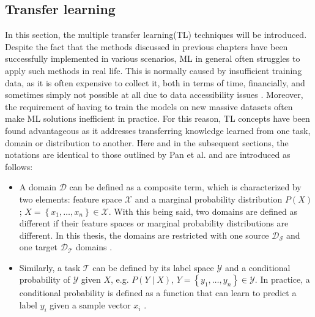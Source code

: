 \documentclass[english, 12pt, a4paper, elec, utf8, a-1b, online]{aaltothesis}
\begin{document}
\subsection{Transfer learning}
\label{transferLearning} 
In this section, the multiple transfer learning(TL) techniques will be introduced. Despite the fact that the methods discussed in previous chapters have been successfully implemented in various scenarios, ML in general often struggles to apply such methods in real life. This is normally caused by insufficient training data, as it is often expensive to collect it, both in terms of time, financially, and sometimes simply not possible at all due to data accessibility issues \cite{Zhuang2019}. Moreover, the requirement of having to train the models on new massive datasets often make ML solutions inefficient in practice. For this reason, TL concepts have been found advantageous as it addresses transferring knowledge learned from one task, domain or distribution to another. Here and in the subsequent sections, the notations are identical to those outlined by Pan et al. \cite{Pan2010} and are introduced as follows:  


\begin{itemize}
\item A domain $\mathcal{D}$ can be defined as a composite term, which is characterized by two elements: feature space $\mathcal{X}$ and a marginal probability distribution $P(X)$; $X=\left\{x_{1}, \ldots, x_{n}\right\} \in \mathcal{X}$. With this being said, two domains are defined as different if their feature spaces or marginal probability distributions are different. In this thesis, the domains are restricted with one source $\mathcal{D_S}$ and one target $\mathcal{D_T}$ domains \cite{Pan2010}. 
\item Similarly, a task $\mathcal{T}$ can be defined by its label space $\mathcal{Y}$ and a conditional probability of $\mathcal{Y}$ given $X$, e.g. $P(Y \mid X)$, $Y=\left\{y_{1}, \ldots, y_{n}\right\} \in \mathcal{Y}$. In practice, a conditional probability is defined as a function that can learn to predict a label $y_i$ given a sample vector $x_i$ \cite{Pan2010}. 
\end{itemize} 
\end{document}
